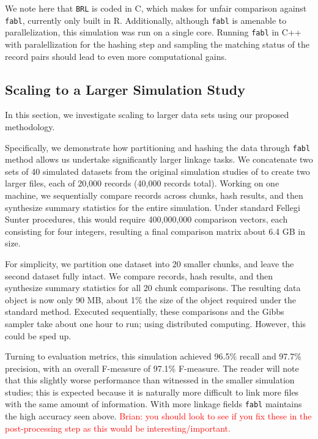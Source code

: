 \documentclass[12pt,letterpaper]{article}
\newcommand{\1}[1]{\mathbb{I}\!\left[#1\right]} %
\begin{document}
We note here that \texttt{BRL} is coded in C, which makes for unfair
comparison against \texttt{fabl}, currently only built in R.
Additionally, although \texttt{fabl} is amenable to parallelization,
this simulation was run on a single core. Running \texttt{fabl} in C++
with paralellization for the hashing step and sampling the matching
status of the record pairs should lead to even more computational gains.

\hypertarget{scale}{%
	\subsection{Scaling to a Larger Simulation Study}\label{scale}}


In this section, we investigate scaling to larger data sets using our proposed methodology. 
 
Specifically, we demonstrate how partitioning and hashing the data through \texttt{fabl} method allows us undertake significantly larger linkage tasks. We concatenate two sets of 40 simulated datasets from the original simulation studies of \cite{} to create two larger files, each of 20,000 records (40,000 records total). Working on one machine, we sequentially compare records across chunks, hash results, and then synthesize summary statistics for the entire simulation. Under standard Fellegi Sunter procedures, this would require 400,000,000 comparison vectors, each consisting for four integers, resulting a final comparison matrix about 6.4 GB in size. 
 
For simplicity, we partition one dataset into 20 smaller chunks, and leave the second dataset fully intact. We compare records, hash results, and then synthesize summary statistics for all 20 chunk comparisons. The resulting data object is now only 90 MB, about 1\% the size of the object required under the standard method. Executed sequentially, these comparisons and the Gibbs sampler take about one hour to run; using distributed computing. However, this could be sped up. 

Turning to evaluation metrics, this simulation achieved 96.5\% recall and 97.7\% precision, with an overall F-measure of 97.1\% F-measure. The reader will note that this slightly worse performance than witnessed in the smaller simulation studies; this is expected because it is naturally more difficult to link more files with the same amount of information. With more linkage fields \texttt{fabl} maintains the high accuracy seen above. \textcolor{red}{Brian: you should look to see if you fix these in the post-processing step as this would be interesting/important.}
 
\end{document}
